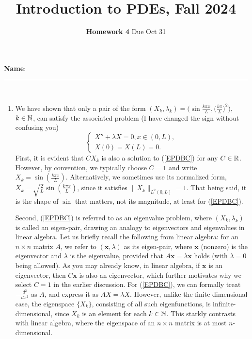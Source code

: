 \documentclass[6pt]{article}
\title{Introduction to PDEs, Fall 2024}
\author{\textbf{Homework 4} Due Oct 31}
\date{}
\numberwithin{equation}{section}
\def\mathbb{\Bbb}
\begin{document}
\maketitle

\textbf{Name}:\rule{1 in}{0.001 in} \\
\begin{enumerate}


\item
We have shown that only a pair of the form $(X_k,\lambda_k)=\Big(\sin \frac{k\pi  x}{L}, \big(\frac{k\pi  }{L}\big)^2\Big)$, $k\in\mathbb N$, can satisfy the associated problem (I have changed the sign without confusing you)
\begin{equation}\label{EPDBC}
\left\{
\begin{array}{ll}
X''+\lambda X=0, x\in (0,L),\\
X(0)=X(L)=0.
\end{array}
\right.
\end{equation}
First, it is evident that \( CX_k \) is also a solution to (\ref{EPDBC}) for any \( C \in \mathbb{R} \). However, by convention, we typically choose \( C = 1 \) and write \( X_k = \sin \left( \frac{k\pi x}{L} \right) \). Alternatively, we sometimes use its normalized form, \( X_k = \sqrt{\frac{2}{L}} \sin \left( \frac{k\pi x}{L} \right) \), since it satisfies \( \| X_k \|_{L^2(0, L)} = 1 \). That being said, it is the shape of \( \sin \) that matters, not its magnitude, at least for (\ref{EPDBC}).


Second, (\ref{EPDBC}) is referred to as an eigenvalue problem, where \( (X_k, \lambda_k) \) is called an eigen-pair, drawing an analogy to eigenvectors and eigenvalues in linear algebra. Let us briefly recall the following from linear algebra: for an \( n \times n \) matrix \( A \), we refer to \( (\mathbf{x}, \lambda) \) as its eigen-pair, where \( \mathbf{x} \) (nonzero) is the eigenvector and \( \lambda \) is the eigenvalue, provided that \( A \mathbf{x} = \lambda \mathbf{x} \) holds (with \( \lambda = 0 \) being allowed).  As you may already know, in linear algebra, if \( \mathbf{x} \) is an eigenvector, then \( C \mathbf{x} \) is also an eigenvector, which further motivates why we select \( C = 1 \) in the earlier discussion.  For (\ref{EPDBC}), we can formally treat \( -\frac{d^2}{dx^2} \) as \( A \), and express it as \( AX = \lambda X \). However, unlike the finite-dimensional case, the eigenspace \( \{X_k\} \), consisting of all such eigenfunctions, is infinite-dimensional, since \( X_k \) is an element for each \( k \in \mathbb{N} \). This starkly contrasts with linear algebra, where the eigenspace of an \( n \times n \) matrix is at most \( n \)-dimensional.



\end{enumerate}
\end{document}
